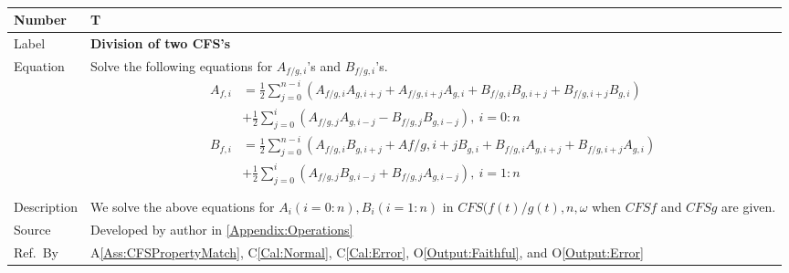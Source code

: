 \documentclass[12pt]{article}
\newcommand{\colAwidth}{0.13\textwidth}
\newcommand{\colBwidth}{0.82\textwidth}
\newcounter{theorynum} %
\newcommand{\aref}[1]{A\ref{#1}}
\newcommand{\calref}[1]{C\ref{#1}}
\newcommand{\oref}[1]{O\ref{#1}}
\begin{document}
~\newline
\noindent
\begin{minipage}{\textwidth}
	\renewcommand*{\arraystretch}{1.5}
	\begin{tabular}{| p{\colAwidth} | p{\colBwidth}|}
		\hline
		\rowcolor[gray]{0.9}
		Number& T{theorynum}\thetheorynum \label{T:Division}\\
		\hline
		Label&\bf Division of two CFS's\\
		\hline
		Equation& Solve the following equations for $A_{f/g, i}$'s and $B_{f/g, i}$'s.   
		\begin{equation}
\begin{aligned}
A_{f, i}
&=\frac{1}{2}\sum_{j=0}^{n-i}(A_{f/g,i}A_{g,i+j}+A_{f/g, i+j}A_{g, i}+B_{f/g,i}B_{g,i+j}+B_{f/g,i+j}B_{g,i})\\&+\frac{1}{2}\sum_{j=0}^{i}(A_{f/g,j}A_{g,i-j}-B_{f/g,j}B_{g,i-j}),~i=0:n\\
B_{f, i}
&=\frac{1}{2}\sum_{j=0}^{n-i}(A_{f/g,i}B_{g,i+j}+A{f/g, i+j}B_{g, i}+B_{f/g,i}A_{g,i+j}+B_{f/g,i+j}A_{g,i})\\&+\frac{1}{2}\sum_{j=0}^{i}(A_{f/g,j}B_{g,i-j}+B_{f/g,j}A_{g,i-j}),~i=1:n\\
\end{aligned}
\end{equation}\\
		\hline
		Description & We solve the above equations for $A_i (i=0:n), B_i(i=1:n)$ in $\mathit{CFS(f(t)/g(t), n, \omega}$ when $\mathit{CFSf}$ and $\mathit{CFSg}$ are given.\\
		
		\hline
		Source & Developed by author in \autoref{Appendix:Operations}\\
		\hline
		Ref.\ By & \aref{Ass:CFSPropertyMatch}, \calref{Cal:Normal}, \calref{Cal:Error}, \oref{Output:Faithful}, and \oref{Output:Error}\\
		\hline
	\end{tabular}
\end{minipage}\\
\end{document}
